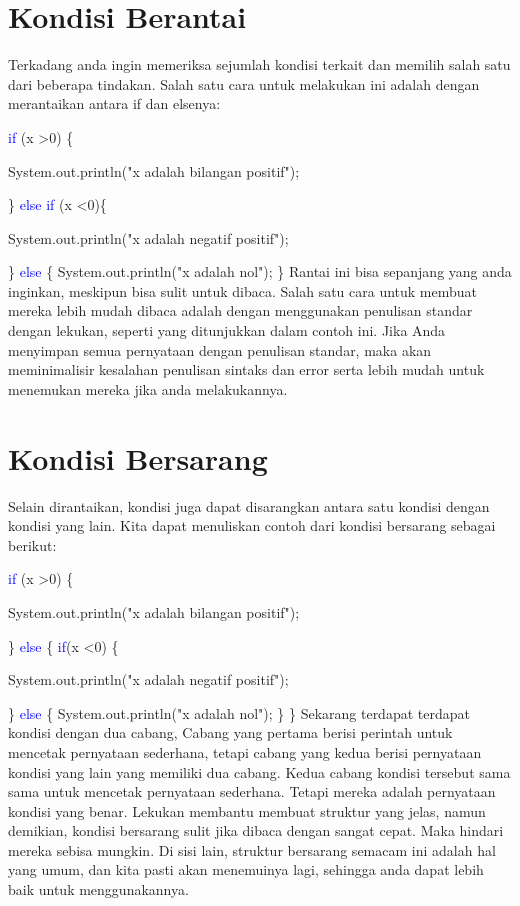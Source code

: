 \section{Kondisi Berantai}
Terkadang anda  ingin memeriksa sejumlah kondisi terkait dan memilih salah satu dari beberapa tindakan. Salah satu cara untuk melakukan ini adalah dengan merantaikan antara if dan elsenya:
\par
\textcolor{blue}{if} (x \textgreater 0) \{
\par
System.out.println("x adalah bilangan positif");
\par
\} \textcolor{blue}{else if} (x \textless 0)\{
\par
System.out.println("x adalah negatif  positif");
\par
\} \textcolor{blue}{else} \{
System.out.println("x adalah nol");
\}
\newline
\newline
Rantai ini bisa sepanjang yang anda inginkan, meskipun bisa sulit untuk dibaca. Salah satu cara untuk membuat mereka lebih mudah dibaca adalah dengan menggunakan penulisan standar dengan lekukan, seperti yang ditunjukkan dalam contoh ini. Jika Anda menyimpan semua pernyataan dengan penulisan standar, maka akan meminimalisir kesalahan penulisan sintaks dan error serta lebih mudah untuk menemukan mereka jika anda melakukannya.

\section{Kondisi Bersarang}
Selain dirantaikan, kondisi juga dapat disarangkan antara satu kondisi dengan kondisi yang lain. Kita dapat menuliskan contoh dari kondisi bersarang sebagai berikut:
\par
\textcolor{blue}{if} (x \textgreater 0) \{
\par
System.out.println("x adalah bilangan positif");
\par
\} \textcolor{blue}{else} \{
\textcolor{blue}{if}(x \textless 0) \{
\par
System.out.println("x adalah negatif  positif");
\par
\} \textcolor{blue}{else} \{
System.out.println("x adalah nol");
\}
\}
\newline
\newline
Sekarang terdapat terdapat kondisi dengan dua cabang, Cabang yang pertama berisi perintah untuk mencetak pernyataan sederhana, tetapi cabang yang kedua berisi pernyataan kondisi yang lain yang memiliki dua cabang. Kedua cabang kondisi tersebut sama sama untuk mencetak pernyataan sederhana. Tetapi mereka adalah pernyataan kondisi yang benar.
\newline
Lekukan membantu membuat struktur yang jelas, namun demikian, kondisi bersarang sulit jika dibaca dengan sangat cepat. Maka hindari mereka sebisa mungkin.
\newline
Di sisi lain, struktur bersarang semacam ini adalah hal yang umum, dan kita pasti akan menemuinya lagi, sehingga anda dapat lebih baik untuk menggunakannya.

